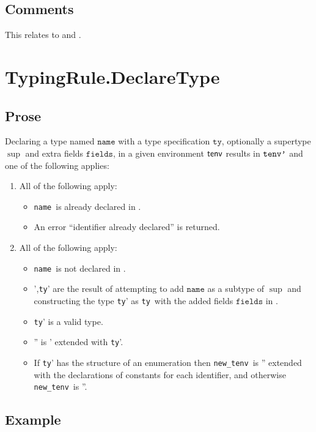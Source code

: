 \documentclass{book}
\newcommand\newtenv[0]{\texttt{new\_tenv}}
\newcommand\tty[0]{\texttt{ty}}
\newcommand\fields[0]{\texttt{fields}}
\newcommand\name[0]{\texttt{name}}
\begin{document}
\subsection{Comments}
This relates to  and .

\section{TypingRule.DeclareType \label{sec:TypingRule.DeclareType}}
\subsection{Prose}
Declaring a type named $\name$ with a type specification $\tty$,
optionally a supertype $\sup$ and extra fields $\fields$, in a given environment $\textsf{tenv}$ results
in $\texttt{tenv'}$ and one of the following applies:
\begin{enumerate}
  \item All of the following apply:
  \begin{itemize}
    \item \name\ is already declared in \tenv.
    \item An error ``identifier already declared'' is returned.
  \end{itemize}
  \item All of the following apply:
  \begin{itemize}
    \item \name\ is not declared in \tenv.
    \item  \tenv',\tty' are the result of attempting to add $\name$ as a subtype of $\sup$ and
    constructing the type \tty' as \tty\ with the added fields $\fields$ in \tenv.
    \item \tty' is a valid type.
    \item \tenv'' is \tenv' extended with \tty'.
    \item If \tty' has the structure of an enumeration then \newtenv\ is \tenv'' extended with the declarations of constants for each identifier,
    and otherwise \newtenv\ is \tenv''.
  \end{itemize}
\end{enumerate}

\subsection{Example}
\end{document}
